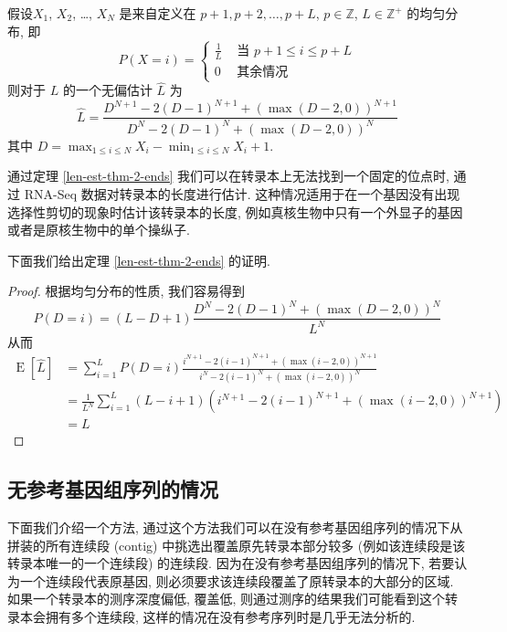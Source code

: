 \begin{thm}
\label{len-est-thm-2-ends}
假设$X_1$, $X_2$, \ldots, $X_N$ 是来自定义在 
${p+1, p+2, \ldots , p+L}$, $p \in \mathbb{Z}$, $L \in \mathbb{Z}^+$ 的均匀分布, 
即 
\[
P(X = i) =  \begin{cases}
\frac{1}{L} & \text{ 当 } p+1 \leq i \leq p+L \\
0 & \text{ 其余情况 }
\end{cases}
\]
则对于 $L$ 的一个无偏估计 $\hat{L}$ 为
\begin{equation}
\label{len-est-thm-2-ends-eq}
\hat{L} = \frac{ D^{N+1} - 2 (D-1)^{N+1} + (\max(D-2, 0))^{N+1} }{ D^{N} - 2 (D-1)^{N} + (\max(D-2, 0))^{N} }
\end{equation}
其中 $D = \max_{1 \leq i \leq N} X_i - \min_{1 \leq i \leq N} X_i +1$. 
\end{thm}

通过定理 \ref{len-est-thm-2-ends} 我们可以在转录本上无法找到一个固定的位点时, 
通过 RNA-Seq 数据对转录本的长度进行估计. 
这种情况适用于在一个基因没有出现选择性剪切的现象时估计该转录本的长度, 
例如真核生物中只有一个外显子的基因或者是原核生物中的单个操纵子. 

下面我们给出定理 \ref{len-est-thm-2-ends} 的证明. 

\begin{proof}
根据均匀分布的性质, 我们容易得到
\[
P(D=i) = (L-D +1) \frac{ D^N - 2 (D-1)^N  + (\max(D-2,0))^N}{ L^N }
\]
从而
\begin{align*}
\operatorname{E}[\hat{L}] &= \sum_{i=1}^L P(D=i) 
    \frac{i^{N+1}-2(i-1)^{N+1}+(\max(i-2,0))^{N+1}}{i^N-2(i-1)^N+(\max(i-2,0))^N} \\
&= \frac{1}{L^N} \sum_{i=1}^L (L-i+1)(i^{N+1}-2(i-1)^{N+1}+(\max(i-2,0))^{N+1}) \\
&= L
\end{align*}

\end{proof}

\subsection{无参考基因组序列的情况}

下面我们介绍一个方法, 
通过这个方法我们可以在没有参考基因组序列的情况下从拼装的所有连续段 (contig) 
中挑选出覆盖原先转录本部分较多 (例如该连续段是该转录本唯一的一个连续段) 的连续段. 
因为在没有参考基因组序列的情况下, 若要认为一个连续段代表原基因, 
则必须要求该连续段覆盖了原转录本的大部分的区域. 
如果一个转录本的测序深度偏低, 覆盖低, 
则通过测序的结果我们可能看到这个转录本会拥有多个连续段, 
这样的情况在没有参考序列时是几乎无法分析的. 

